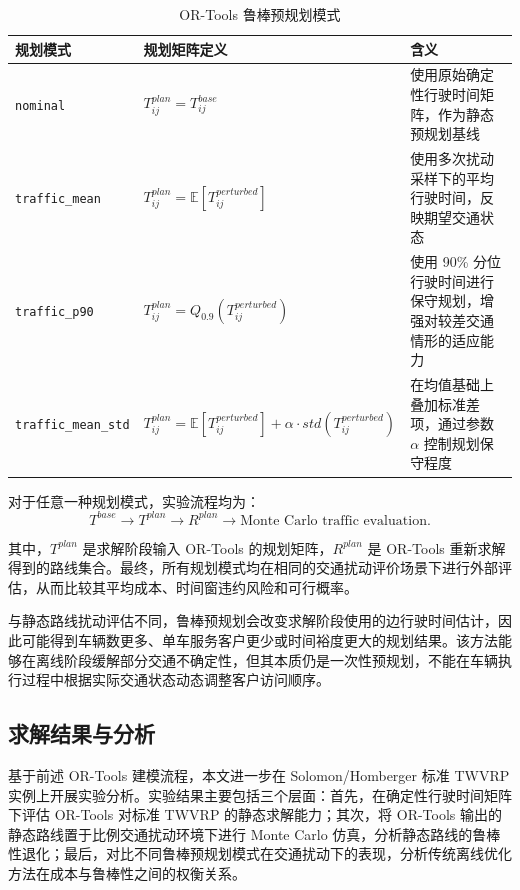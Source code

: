 \documentclass[12pt,a4paper,UTF8]{article}
\begin{document}
\begin{table}[!htbp]
    \centering
    \caption{OR-Tools 鲁棒预规划模式}
    \label{tab:ortools_robust_planning_modes}
    \small
    \begin{tabularx}{\textwidth}{p{3.2cm} p{4.6cm} X}
        \toprule
        规划模式 & 规划矩阵定义 & 含义 \\
        \midrule
        \texttt{nominal} &
        $T^{plan}_{ij}=T^{base}_{ij}$ &
        使用原始确定性行驶时间矩阵，作为静态预规划基线 \\
        \midrule
        \texttt{traffic\_mean} &
        $T^{plan}_{ij}=\mathbb{E}[T^{perturbed}_{ij}]$ &
        使用多次扰动采样下的平均行驶时间，反映期望交通状态 \\
        \midrule
        \texttt{traffic\_p90} &
        $T^{plan}_{ij}=Q_{0.9}(T^{perturbed}_{ij})$ &
        使用 90\% 分位行驶时间进行保守规划，增强对较差交通情形的适应能力 \\
        \midrule
        \texttt{traffic\_mean\_std} &
        $T^{plan}_{ij}=\mathbb{E}[T^{perturbed}_{ij}]+\alpha\cdot std(T^{perturbed}_{ij})$ &
        在均值基础上叠加标准差项，通过参数 $\alpha$ 控制规划保守程度 \\
        \bottomrule
    \end{tabularx}
\end{table}

对于任意一种规划模式，实验流程均为：
\[
    T^{base}
    \rightarrow
    T^{plan}
    \rightarrow
    R^{plan}
    \rightarrow
    \text{Monte Carlo traffic evaluation}.
\]

其中，$T^{plan}$ 是求解阶段输入 OR-Tools 的规划矩阵，$R^{plan}$ 是 OR-Tools 重新求解得到的路线集合。最终，所有规划模式均在相同的交通扰动评价场景下进行外部评估，从而比较其平均成本、时间窗违约风险和可行概率。

与静态路线扰动评估不同，鲁棒预规划会改变求解阶段使用的边行驶时间估计，因此可能得到车辆数更多、单车服务客户更少或时间裕度更大的规划结果。该方法能够在离线阶段缓解部分交通不确定性，但其本质仍是一次性预规划，不能在车辆执行过程中根据实际交通状态动态调整客户访问顺序。

\subsection{求解结果与分析}

基于前述 OR-Tools 建模流程，本文进一步在 Solomon/Homberger 标准 TWVRP 实例上开展实验分析。实验结果主要包括三个层面：首先，在确定性行驶时间矩阵下评估 OR-Tools 对标准 TWVRP 的静态求解能力；其次，将 OR-Tools 输出的静态路线置于比例交通扰动环境下进行 Monte Carlo 仿真，分析静态路线的鲁棒性退化；最后，对比不同鲁棒预规划模式在交通扰动下的表现，分析传统离线优化方法在成本与鲁棒性之间的权衡关系。
\end{document}
